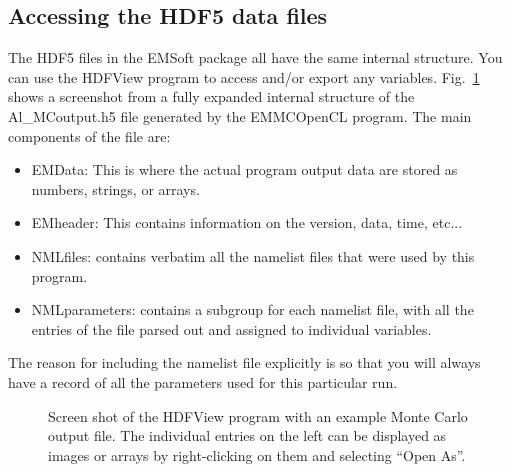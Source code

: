 \documentclass[DIV=calc, paper=letter, fontsize=11pt]{scrartcl}	 %
\begin{document}
\subsection{Accessing the HDF5 data files}
The HDF5 files in the EMSoft package all have the same internal structure.  You can use the HDFView program to
access and/or export any variables.  Fig.~\ref{fig:hdf} shows a screenshot from a fully expanded internal structure of the Al\_MCoutput.h5
file generated by the EMMCOpenCL program.  The main components of the file are: 
\begin{itemize}
	\item EMData: This is where the actual program output data are stored as numbers, strings, or arrays.
	\item EMheader: This contains information on the version, data, time, etc...
	\item NMLfiles: contains verbatim all the namelist files that were used by this program.
	\item NMLparameters: contains a subgroup for each namelist file, with all the entries of the file parsed out and 
	assigned to individual variables.
\end{itemize}
The reason for including the namelist file explicitly is so that you will always have a record of all the parameters used 
for this particular run.

\begin{figure}[h]
\leavevmode\centering
\epsfxsize=5.0in
\caption{\label{fig:hdf}Screen shot of the HDFView program with an example Monte Carlo output file.  The individual entries
on the left can be displayed as images or arrays by right-clicking on them and selecting ``Open As''.}
\end{figure}
\end{document}
